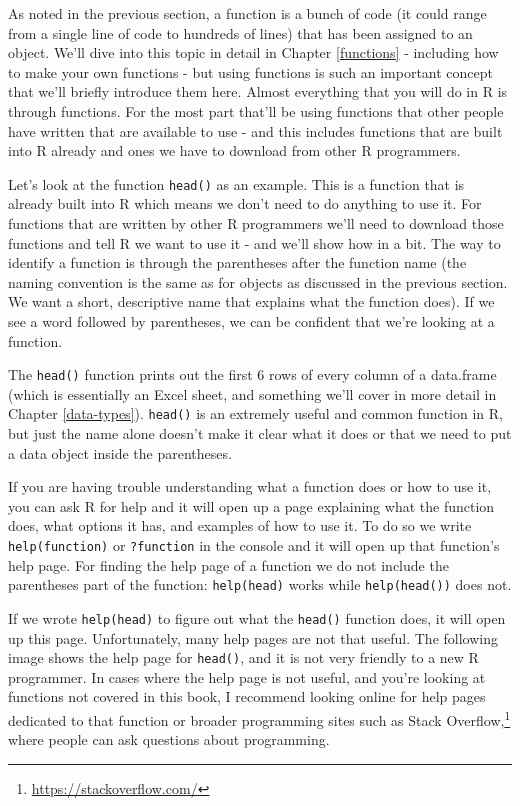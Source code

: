\documentclass[
  a4paper,
]{krantz}
\renewcommand{\href}[2]{#2\footnote{\url{#1}}}
\begin{document}
As noted in the previous section, a function is a bunch of
code (it could range from a single line of code to hundreds
of lines) that has been assigned to an object. We'll dive
into this topic in detail in Chapter \ref{functions} -
including how to make your own functions - but using
functions is such an important concept that we'll briefly
introduce them here. Almost everything that you will do in R
is through functions. For the most part that'll be using
functions that other people have written that are available
to use - and this includes functions that are built into R
already and ones we have to download from other R
programmers.

Let's look at the function \texttt{head()} as an example.
This is a function that is already built into R which means
we don't need to do anything to use it. For functions that
are written by other R programmers we'll need to download
those functions and tell R we want to use it - and we'll
show how in a bit. The way to identify a function is through
the parentheses after the function name (the naming
convention is the same as for objects as discussed in the
previous section. We want a short, descriptive name that
explains what the function does). If we see a word followed
by parentheses, we can be confident that we're looking at a
function.

The \texttt{head()} function prints out the first 6 rows of
every column of a data.frame (which is essentially an Excel
sheet, and something we'll cover in more detail in Chapter
\ref{data-types}). \texttt{head()} is an extremely useful
and common function in R, but just the name alone doesn't
make it clear what it does or that we need to put a data
object inside the parentheses.

If you are having trouble understanding what a function does
or how to use it, you can ask R for help and it will open up
a page explaining what the function does, what options it
has, and examples of how to use it. To do so we write
\texttt{help(function)} or \texttt{?function} in the console
and it will open up that function's help page. For finding
the help page of a function we do not include the
parentheses part of the function: \texttt{help(head)} works
while \texttt{help(head())} does not.

If we wrote \texttt{help(head)} to figure out what the
\texttt{head()} function does, it will open up this page.
Unfortunately, many help pages are not that useful. The
following image shows the help page for \texttt{head()}, and
it is not very friendly to a new R programmer. In cases
where the help page is not useful, and you're looking at
functions not covered in this book, I recommend looking
online for help pages dedicated to that function or broader
programming sites such as
\href{https://stackoverflow.com/}{Stack Overflow,} where
people can ask questions about programming.
\end{document}
